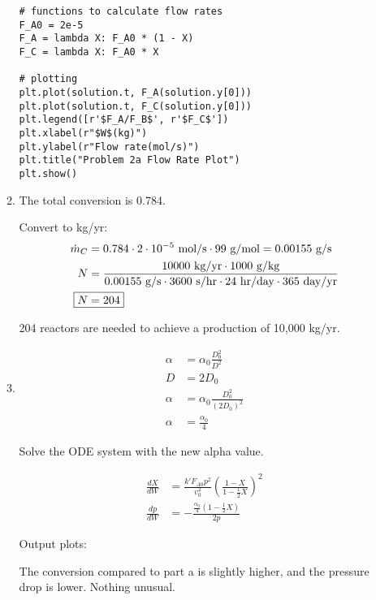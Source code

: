 \documentclass[12pt]{article}
\begin{document}
\begin{enumerate}
\begin{enumerate}
\begin{verbatim}
# functions to calculate flow rates
F_A0 = 2e-5
F_A = lambda X: F_A0 * (1 - X)
F_C = lambda X: F_A0 * X

# plotting
plt.plot(solution.t, F_A(solution.y[0]))
plt.plot(solution.t, F_C(solution.y[0]))
plt.legend([r'$F_A/F_B$', r'$F_C$'])
plt.xlabel(r"$W$(kg)")
plt.ylabel(r"Flow rate(mol/s)")
plt.title("Problem 2a Flow Rate Plot")
plt.show()
\end{verbatim}
    

    \item

    The total conversion is 0.784.

    Convert to kg/yr:
    \begin{align*}
        \dot m_C &= 0.784 \cdot 2\cdot10^{-5} \text{ mol/s} \cdot 99 \text{ g/mol} = 0.00155 \text{ g/s} \\
        N &= \frac{10000 \text{ kg/yr} \cdot 1000 \text{ g/kg}}{0.00155 \text{ g/s} \cdot 3600 \text{ s/hr} \cdot 24 \text{ hr/day} \cdot 365 \text{ day/yr}} \\
        \Aboxed{N &= 204}
    \end{align*}

    204 reactors are needed to achieve a production of 10,000 kg/yr.

    \item
    \begin{align*}
        \alpha &= \alpha_0 \frac{D_0^2}{D^2} \\
        D &= 2 D_0 \\
        \alpha &= \alpha_0 \frac{D_0^2}{(2 D_0)^2} \\
        \alpha &= \frac{\alpha_0}{4}
    \end{align*}

    Solve the ODE system with the new alpha value.

    \begin{align*}
        \frac{dX}{dW} &= \frac{k' F_{A0} p^2}{v_0^2} \left( \frac{1 - X}{1 -\frac{1}{2}X} \right)^2 \\
        \frac{dp}{dW} &= -\frac{\frac{\alpha_0}{4} \left( 1 -\frac{1}{2}X \right)}{2p}
    \end{align*}

    Output plots:

    

    

    The conversion compared to part a is slightly higher, and the pressure drop is lower. Nothing unusual.


\end{enumerate}
\end{enumerate}
\end{document}
